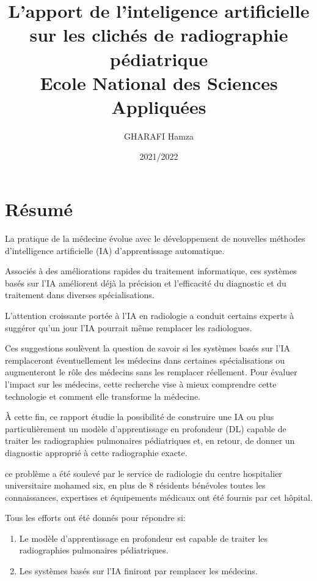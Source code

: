 \documentclass[12pt]{report}
\title{L'apport de l'inteligence artificielle sur les clichés de radiographie pédiatrique
\\ {\Large Ecole National des Sciences Appliquées}}
\author{GHARAFI Hamza}
\date{2021/2022}
\begin{document}
    \newcommand{\listequationsname}{Liste des Equations}
    \newlistof{myequations}{equ}{\listequationsname}
    \newcommand{\myequations}[1]{%
    \addcontentsline{equ}{myequations}{\protect\numberline{\theequation}#1}\par}


    \maketitle

    \chapter*{Résumé}
    La pratique de la médecine évolue avec le développement de nouvelles méthodes d'intelligence artificielle (IA) d'apprentissage automatique. 
    
    Associés à des améliorations rapides du traitement informatique, ces systèmes basés sur l'IA améliorent déjà la précision et l'efficacité du diagnostic et du traitement dans diverses spécialisations. 
    
    L'attention croissante portée à l'IA en radiologie a conduit certains experts à suggérer qu'un jour l'IA pourrait même remplacer les radiologues. 
    
    Ces suggestions soulèvent la question de savoir si les systèmes basés sur l'IA remplaceront éventuellement les médecins dans certaines spécialisations ou augmenteront le rôle des médecins sans les remplacer réellement. Pour évaluer l'impact sur les médecins, cette recherche vise à mieux comprendre cette technologie et comment elle transforme la médecine. 
    
    À cette fin, ce rapport étudie la possibilité de construire une IA ou plus particulièrement un modèle d'apprentissage en profondeur (DL) capable de traiter les radiographies pulmonaires pédiatriques et, en retour, de donner un diagnostic approprié à cette radiographie exacte.

    ce problème a été soulevé par le service de radiologie du centre hospitalier universitaire mohamed six, en plus de 8 résidents bénévoles toutes les connaissances, expertises et équipements médicaux ont été fournis par cet hôpital.

    Tous les efforts ont été donnés pour répondre si:

    \begin{enumerate}
        \item Le modèle d'apprentissage en profondeur est capable de traiter les radiographies pulmonaires pédiatriques.
        \item Les systèmes basés sur l'IA finiront par remplacer les médecins.
    \end{enumerate}
\end{document}
